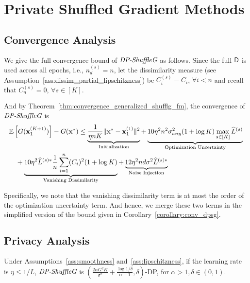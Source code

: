 \section{Private Shuffled Gradient Methods}
\label{sec:appendix_private_shuffled_g}

\subsection{Convergence Analysis}


We give the full convergence bound of $\textit{DP-ShuffleG}$ as follows.
Since the full ${\mathsf{D}}$ is used across all epochs, i.e., $n_d^{(s)} = n$, let the dissimilarity measure (see Assumption~\ref{ass:dissim_partial_lipschitzness}) be $C_i^{(s)} = C_i$, $\forall i < n$ and recall that $C_n^{(s)} = 0$, $\forall s\in [K]$. 

And by Theorem~\ref{thm:convergence_generalized_shufflg_fm}, the convergence of $\textit{DP-ShuffleG}$ is
\begin{align}
    &\mathbb{E}\left[ G({\mathbf{x}}_1^{(K+1)}) \right] - G({\mathbf{x}}^*) \leq \underbrace{
    \frac{1}{\eta n K}\|{\mathbf{x}}^* - {\mathbf{x}}_1^{(1)}\|^2
    }_{\text{Initialization}}
    + \underbrace{ 10 \eta^2 n^2 \sigma_{any}^2 (1+\log K)\max_{s\in[K]} \widehat{L}^{(s)}
    }_{\text{Optimization Uncertainty}}\\
    \nonumber
    &\quad + \underbrace{ 10 \eta^2 \widehat{L}^{(s)*} \frac{1}{n}\sum_{i=1}^{n} (C_i)^2 (1+\log K)
    }_{\text{Vanishing Dissimilarity}}
    + \underbrace{ 12 \eta^2 nd \sigma^2 \widehat{L}^{(s)*} }_{\text{Noise Injection}}
\end{align}

Specifically, we note that the vanishing dissimilarity term is at most the order of the optimization uncertainty term. 
And hence, we merge these two terms in the simplified version of the bound given in Corollary~\ref{corollary:conv_dpsg}.



\subsection{Privacy Analysis}
\label{subsec:appendix_private_shuffled_g_privacy}




\begin{lemma}
\label{lemma:appendix_privacy_private_shuffled_g}
    Under Assumptions~\ref{ass:smoothness} and~\ref{ass:lipschitzness}, if the learning rate is $\eta \leq 1/L$, $\textit{DP-ShuffleG}$ is $(\frac{2\alpha G^2 K}{\sigma^2} + \frac{\log 1/\delta}{\alpha - 1}, \delta)$-DP, for $\alpha > 1, \delta \in (0, 1)$.
\end{lemma}


